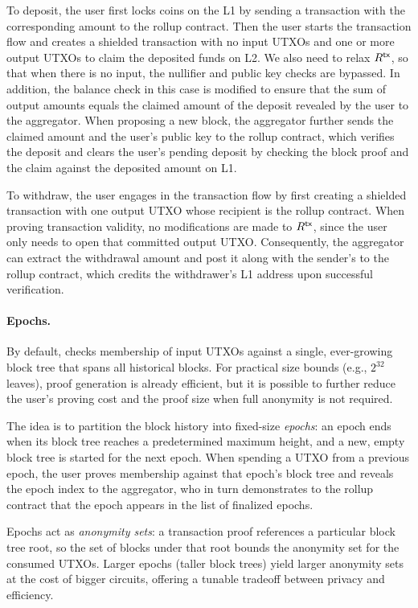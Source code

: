 To deposit, the user first locks coins on the \ac{L1} by sending a transaction with the corresponding amount to the rollup contract.
Then the user starts the transaction flow and creates a shielded transaction with no input \acp{UTXO} and one or more output \acp{UTXO} to claim the deposited funds on \ac{L2}.
We also need to relax $R^\mathsf{tx}$, so that when there is no input, the nullifier and public key checks are bypassed.
In addition, the balance check in this case is modified to ensure that the sum of output amounts equals the claimed amount of the deposit revealed by the user to the aggregator.
When proposing a new block, the aggregator further sends the claimed amount and the user's public key to the rollup contract, which verifies the deposit and clears the user's pending deposit by checking the block proof and the claim against the deposited amount on \ac{L1}.

To withdraw, the user engages in the transaction flow by first creating a shielded transaction with one output \ac{UTXO} whose recipient is the rollup contract.
When proving transaction validity, no modifications are made to $R^\mathsf{tx}$, since the user only needs to open that committed output \ac{UTXO}.
Consequently, the aggregator can extract the withdrawal amount and post it along with the sender's \Pk to the rollup contract, which credits the withdrawer's \ac{L1} address upon successful verification.

\paragraph{Epochs.}

By default, \Protocol checks membership of input \acp{UTXO} against a single, ever-growing block tree that spans all historical blocks.
For practical size bounds (e.g., $2^{32}$ leaves), proof generation is already efficient, but it is possible to further reduce the user's proving cost and the proof size when full anonymity is not required.

The idea is to partition the block history into fixed-size \textit{epochs}: an epoch ends when its block tree reaches a predetermined maximum height, and a new, empty block tree is started for the next epoch.
When spending a \ac{UTXO} from a previous epoch, the user proves membership against that epoch's block tree and reveals the epoch index to the aggregator, who in turn demonstrates to the rollup contract that the epoch appears in the list of finalized epochs.

Epochs act as \textit{anonymity sets}: a transaction proof references a particular block tree root, so the set of blocks under that root bounds the anonymity set for the consumed \acp{UTXO}.
Larger epochs (taller block trees) yield larger anonymity sets at the cost of bigger circuits, offering a tunable tradeoff between privacy and efficiency.


